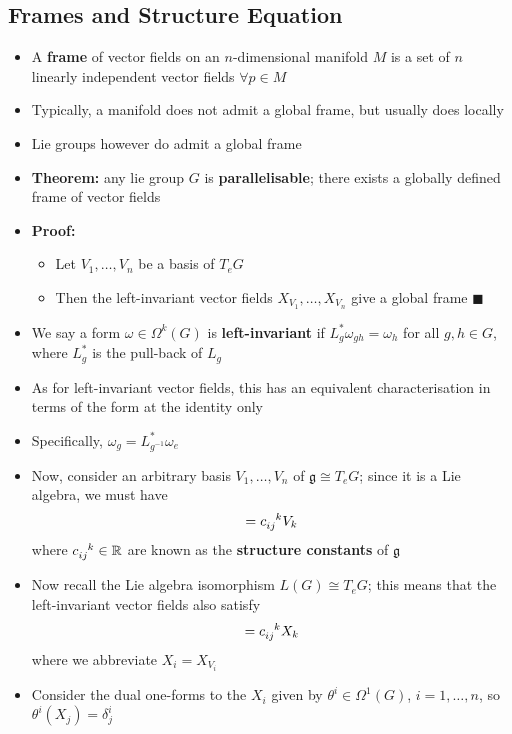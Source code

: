 \documentclass[12pt,a4paper]{article}
\numberwithin{equation}{section}
\begin{document}
	\subsection{Frames and Structure Equation}
	\begin{itemize}
		\item A \textbf{frame} of vector fields on an $n$-dimensional manifold $M$ is a set of $n$ linearly independent vector fields $\forall p\in M$
		\item Typically, a manifold does not admit a global frame, but usually does locally
		\item Lie groups however do admit a global frame
		\item \textbf{Theorem:} any lie group $G$ is \textbf{parallelisable}; there exists a globally defined frame of vector fields
		\item \textbf{Proof:}
		\begin{itemize}
			\item Let $V_{1},\ldots,V_{n}$ be a basis of $T_{e}G$
			\item Then the left-invariant vector fields $X_{V_{1}},\ldots,X_{V_{n}}$ give a global frame $\blacksquare$
		\end{itemize}
		\item We say a form $\omega\in \Omega^{k}(G)$ is \textbf{left-invariant} if $L_{g}^{*}\omega_{gh}=\omega_{h}$ for all $g,h\in G$, where $L_{g}^{*}$ is the pull-back of $L_{g}$
		\item As for left-invariant vector fields, this has an equivalent characterisation in terms of the form at the identity only
		\item Specifically, $\omega_{g}=L_{g^{-1}}^{*}\omega_{e}$
		\item Now, consider an arbitrary basis $V_{1},\ldots,V_{n}$ of $\mathfrak{g}\cong T_{e}G$; since it is a Lie algebra, we must have
		\begin{equation}
			[V_{i},V_{j}]=c\indices{_i_j^k}V_{k}
		\end{equation}
		where $c\indices{_i_j^k}\in\mathbb{R}$ are known as the \textbf{structure constants} of $\mathfrak{g}$
		\item Now recall the Lie algebra isomorphism $L(G)\cong T_{e}G$; this means that the left-invariant vector fields also satisfy
		\begin{equation}
			[X_{i},X_{j}]=c\indices{_i_j^k}X_{k}
		\end{equation}
		where we abbreviate $X_{i}=X_{V_{i}}$
		\item Consider the dual one-forms to the $X_{i}$ given by $\theta^{i}\in \Omega^{1}(G)$, $i=1,\ldots,n$, so $\theta^{i}(X_{j})=\delta^{i}_{j}$

\end{itemize}
\end{document}

